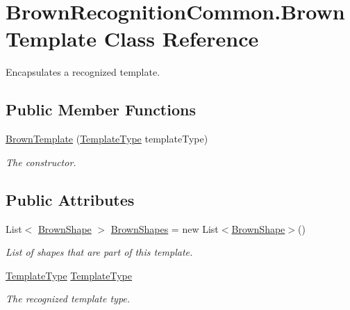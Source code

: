 \hypertarget{class_brown_recognition_common_1_1_brown_template}{
\section{\-Brown\-Recognition\-Common.\-Brown\-Template \-Class \-Reference}
\label{class_brown_recognition_common_1_1_brown_template}
}


\-Encapsulates a recognized template.  


\subsection*{\-Public \-Member \-Functions}
\begin{DoxyCompactItemize}
\item 
\hyperlink{class_brown_recognition_common_1_1_brown_template_aa03fa2236c307639dacb39e30da8557c}{\-Brown\-Template} (\hyperlink{namespace_brown_recognition_common_a08ddb81441b8ac27fc140488e6dbb160}{\-Template\-Type} template\-Type)
\begin{DoxyCompactList}\small\item\em \-The constructor. \end{DoxyCompactList}\end{DoxyCompactItemize}
\subsection*{\-Public \-Attributes}
\begin{DoxyCompactItemize}
\item 
\-List$<$ \hyperlink{class_brown_recognition_common_1_1_brown_shape}{\-Brown\-Shape} $>$ \hyperlink{class_brown_recognition_common_1_1_brown_template_a6e613bc00f88d59951461ff8db024491}{\-Brown\-Shapes} = new \-List$<$\hyperlink{class_brown_recognition_common_1_1_brown_shape}{\-Brown\-Shape}$>$()
\begin{DoxyCompactList}\small\item\em \-List of shapes that are part of this template. \end{DoxyCompactList}\item 
\hyperlink{namespace_brown_recognition_common_a08ddb81441b8ac27fc140488e6dbb160}{\-Template\-Type} \hyperlink{class_brown_recognition_common_1_1_brown_template_a4e4ddd1ca40ec9c91266fae36e491d33}{\-Template\-Type}
\begin{DoxyCompactList}\small\item\em \-The recognized template type. \end{DoxyCompactList}\end{DoxyCompactItemize}


